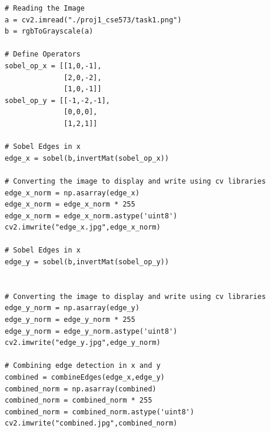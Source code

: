 \documentclass[12pt]{article}
\newenvironment{QandA}
{
	\begin{enumerate}[label=\normalfont\arabic*.,leftmargin=2em,rightmargin=2em]\normalfont
	}
	{
	\end{enumerate}
}
\newenvironment{codelalala}{}{}
\newenvironment{answered}{\setlength{\parindent}{1em}\par\normalfont}{}
\begin{document}
\begin{QandA}
\begin{answered}
\begin{codelalala}
\begin{verbatim}
# Reading the Image
a = cv2.imread("./proj1_cse573/task1.png")
b = rgbToGrayscale(a)

# Define Operators
sobel_op_x = [[1,0,-1],
              [2,0,-2],
              [1,0,-1]]
sobel_op_y = [[-1,-2,-1],
              [0,0,0],
              [1,2,1]]

# Sobel Edges in x
edge_x = sobel(b,invertMat(sobel_op_x))

# Converting the image to display and write using cv libraries
edge_x_norm = np.asarray(edge_x)
edge_x_norm = edge_x_norm * 255
edge_x_norm = edge_x_norm.astype('uint8')
cv2.imwrite("edge_x.jpg",edge_x_norm)

# Sobel Edges in x
edge_y = sobel(b,invertMat(sobel_op_y))


# Converting the image to display and write using cv libraries
edge_y_norm = np.asarray(edge_y)
edge_y_norm = edge_y_norm * 255
edge_y_norm = edge_y_norm.astype('uint8')
cv2.imwrite("edge_y.jpg",edge_y_norm)

# Combining edge detection in x and y
combined = combineEdges(edge_x,edge_y)
combined_norm = np.asarray(combined)
combined_norm = combined_norm * 255
combined_norm = combined_norm.astype('uint8')
cv2.imwrite("combined.jpg",combined_norm)


\end{verbatim}
\end{codelalala}
\end{answered}
\end{QandA}
\end{document}
